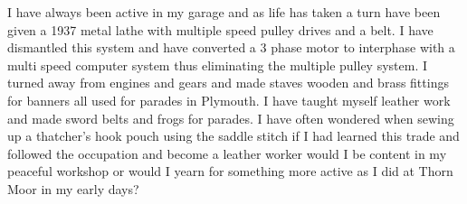 
I have always been active in my garage and as life has taken a turn have been
given a 1937 metal lathe with multiple speed pulley drives and a belt. I have
dismantled this system and have converted a 3 phase motor to interphase with a
multi speed computer system thus eliminating the multiple pulley system. I
turned away from engines and gears and made staves wooden and brass fittings
for banners all used for parades in Plymouth. I have taught myself leather work
and made sword belts and frogs for parades. I have often wondered when sewing
up a thatcher's hook pouch using the saddle stitch if I had learned this trade
and followed the occupation and become a leather worker would I be content in
my peaceful workshop or would I yearn for something more active as I did at
Thorn Moor in my early days?

